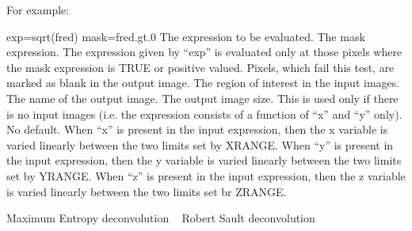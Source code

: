 {For example:

{\eightpoint\begintt
   exp=sqrt(fred) mask=fred.gt.0
\endtt}
The expression to be evaluated.
The mask expression. The expression given by ``exp'' is evaluated
only at those pixels where the mask expression is TRUE or
positive valued. Pixels, which fail this test, are marked as blank
in the output image.
The region of interest in the input images.
The name of the output image.
The output image size. This is used only if there is no input
images (i.e. the expression consists of a function of ``x'' and
``y'' only). No default.
When ``x'' is present in the input expression, then the x variable
is varied linearly between the two limits set by XRANGE.
When ``y'' is present in the input expression, then the y variable
is varied linearly between the two limits set by YRANGE.
When ``z'' is present in the input expression, then the z variable
is varied linearly between the two limits set br ZRANGE.
\par}
%
\noindent Maximum Entropy deconvolution
\newline \ 
\newline {} Robert Sault
\newline {} deconvolution
